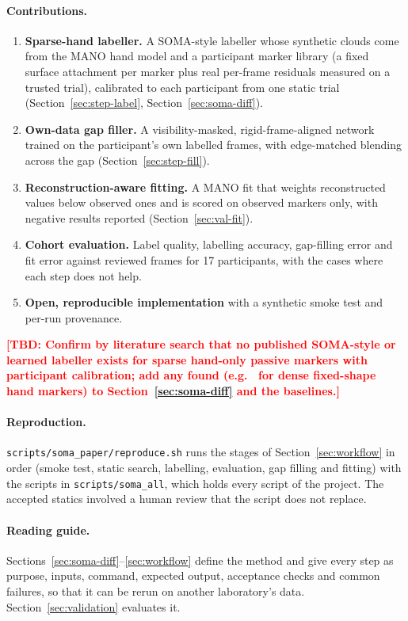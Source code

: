 \documentclass[11pt,a4paper]{article}
\newcommand{\tbd}[1]{\textcolor{red}{\textbf{[TBD: #1]}}}
\begin{document}
\paragraph{Contributions.}
\begin{enumerate}[nosep]
  \item \textbf{Sparse-hand labeller.} A SOMA-style labeller whose synthetic clouds come from the MANO hand model and a
  participant marker library (a fixed surface attachment per marker plus real per-frame residuals measured on a trusted
  trial), calibrated to each participant from one static trial (Section~\ref{sec:step-label}, Section~\ref{sec:soma-diff}).
  \item \textbf{Own-data gap filler.} A visibility-masked, rigid-frame-aligned network trained on the participant's own
  labelled frames, with edge-matched blending across the gap (Section~\ref{sec:step-fill}).
  \item \textbf{Reconstruction-aware fitting.} A MANO fit that weights reconstructed values below observed ones and is
  scored on observed markers only, with negative results reported (Section~\ref{sec:val-fit}).
  \item \textbf{Cohort evaluation.} Label quality, labelling accuracy, gap-filling error and fit error against reviewed
  frames for 17 participants, with the cases where each step does not help.
  \item \textbf{Open, reproducible implementation} with a synthetic smoke test and per-run provenance.
\end{enumerate}
\tbd{Confirm by literature search that no published SOMA-style or learned labeller exists for sparse hand-only passive
markers with participant calibration; add any found (e.g.\ \citet{han2018online} for dense fixed-shape hand markers) to
Section~\ref{sec:soma-diff} and the baselines.}

\paragraph{Reproduction.} \texttt{scripts/soma\_paper/reproduce.sh} runs the stages of Section~\ref{sec:workflow} in
order (smoke test, static search, labelling, evaluation, gap filling and fitting) with the scripts in
\texttt{scripts/soma\_all}, which holds every script of the project. The accepted statics involved a human review that
the script does not replace.

\paragraph{Reading guide.} Sections~\ref{sec:soma-diff}--\ref{sec:workflow} define the method and give every step as
purpose, inputs, command, expected output, acceptance checks and common failures, so that it can be rerun on another
laboratory's data. Section~\ref{sec:validation} evaluates it.
\end{document}
